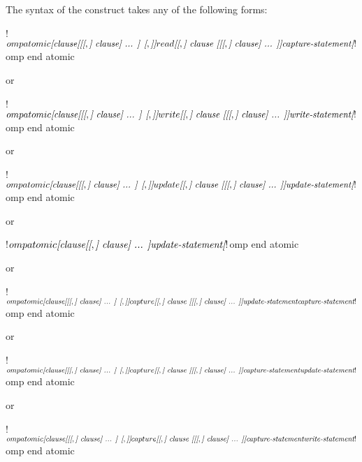 \begin{fortranspecific}
The syntax of the  construct takes any of the following forms:

\begin{ompfPragma}
!$omp atomic \plc{[clause[[[},\plc{] clause] ... ] [},\plc{]]} read \plc{[[},\plc{] clause [[[},\plc{] clause] ... ]]}
    \plc{capture-statement}
\plc{[}!$omp end atomic\plc{]}
\end{ompfPragma}

or

\begin{ompfPragma}
!$omp atomic \plc{[clause[[[},\plc{] clause] ... ] [},\plc{]]} write \plc{[[},\plc{] clause [[[},\plc{] clause] ... ]]}
    \plc{write-statement}
\plc{[}!$omp end atomic\plc{]}
\end{ompfPragma}

or

\begin{ompfPragma}
!$omp atomic \plc{[clause[[[},\plc{] clause] ... ] [},\plc{]]} update \plc{[[},\plc{] clause [[[},\plc{] clause] ... ]]}
    \plc{update-statement}
\plc{[}!$omp end atomic\plc{]}
\end{ompfPragma}

or


\begin{ompfPragma}
!$omp atomic \plc{[clause[[},\plc{] clause] ... ]}
    \plc{update-statement}
\plc{[}!$omp end atomic\plc{]}
\end{ompfPragma}

or

\begin{ompfPragma}
!$omp atomic \plc{[clause[[[},\plc{] clause] ... ] [},\plc{]]} capture \plc{[[},\plc{] clause [[[},\plc{] clause] ... ]]}
    \plc{update-statement}
    \plc{capture-statement}
!$omp end atomic
\end{ompfPragma}

or

\begin{ompfPragma}
!$omp atomic \plc{[clause[[[},\plc{] clause] ... ] [},\plc{]]} capture \plc{[[},\plc{] clause [[[},\plc{] clause] ... ]]}
    \plc{capture-statement}
    \plc{update-statement}
!$omp end atomic
\end{ompfPragma}

or

\begin{ompfPragma}
!$omp atomic \plc{[clause[[[},\plc{] clause] ... ] [},\plc{]]} capture \plc{[[},\plc{] clause [[[},\plc{] clause] ... ]]}
    \plc{capture-statement}
    \plc{write-statement}
!$omp end atomic
\end{ompfPragma}


\end{fortranspecific}
